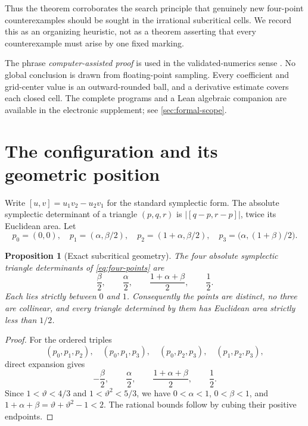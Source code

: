 \documentclass[11pt,reqno]{amsart}
\numberwithin{equation}{section}
\newtheorem{proposition}[theorem]{Proposition}
\theoremstyle{definition}
\newcommand{\abs}[1]{\lvert #1\rvert}
\begin{document}
Thus the theorem corroborates the search principle that genuinely new
four-point counterexamples should be sought in the irrational subcritical
cells.  We record this as an organizing heuristic, not as a theorem asserting
that every counterexample must arise by one fixed marking.

The phrase \emph{computer-assisted proof} is used in the validated-numerics
sense \cite{johansson2017arb,moore2009,rump2010}.  No global conclusion is
drawn from floating-point sampling.  Every coefficient and grid-center value
is an outward-rounded ball, and a derivative estimate covers each closed
cell.  The complete programs and a Lean algebraic companion are available in
the electronic supplement; see \cref{sec:formal-scope}.

\section{The configuration and its geometric position}
\label{sec:geometry}

Write $[u,v]=u_1v_2-u_2v_1$ for the standard symplectic form.  The absolute
symplectic determinant of a triangle $(p,q,r)$ is
$\abs{[q-p,r-p]}$, twice its Euclidean area.  Let
\begin{equation}\label{eq:four-points}
 p_0=(0,0),\quad
 p_1=(\alpha,\beta/2),\quad
 p_2=(1+\alpha,\beta/2),\quad
 p_3=\bigl(\alpha,(1+\beta)/2\bigr).
\end{equation}

\begin{proposition}[Exact subcritical geometry]\label{prop:geometry}
The four absolute symplectic triangle determinants of
\eqref{eq:four-points} are
\begin{equation}\label{eq:four-determinants}
 \frac{\beta}{2},\qquad \frac{\alpha}{2},\qquad
 \frac{1+\alpha+\beta}{2},\qquad \frac12.
\end{equation}
Each lies strictly between $0$ and $1$.  Consequently the points are
distinct, no three are collinear, and every triangle determined by them has
Euclidean area strictly less than $1/2$.
\end{proposition}

\begin{proof}
For the ordered triples
\[
 (p_0,p_1,p_2),\quad (p_0,p_1,p_3),\quad
 (p_0,p_2,p_3),\quad (p_1,p_2,p_3),
\]
direct expansion gives
\[
 -\frac\beta2,\qquad \frac\alpha2,\qquad
 \frac{1+\alpha+\beta}{2},\qquad \frac12.
\]
Since $1<\vartheta<4/3$ and $1<\vartheta^2<5/3$, we have
$0<\alpha<1$, $0<\beta<1$, and
$1+\alpha+\beta=\vartheta+\vartheta^2-1<2$.  The rational bounds follow
by cubing their positive endpoints.
\end{proof}
\end{document}
